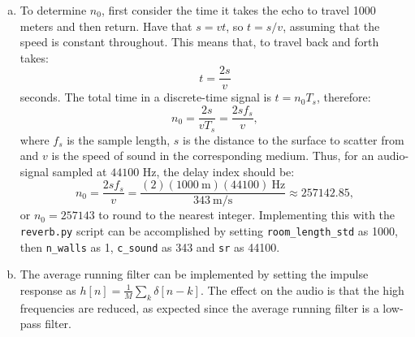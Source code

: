 \begin{enumerate}
\begin{enumerate}[a)]
    \item To determine $n_{0}$, first consider the time it takes the echo to travel 
    1000 meters and then return. Have that $s=vt$, so $t=s/v$, assuming that 
    the speed is constant throughout. This means that, to travel back and forth takes:
    $$t=\frac{2s}{v}$$
    seconds. The total time in a discrete-time signal is $t=n_{0}T_{s}$, therefore:
    $$n_{0}=\frac{2s}{vT_{s}}=\frac{2sf_{s}}{v},$$
    where $f_{s}$ is the sample length, $s$ is the distance to the surface to scatter 
    from and $v$ is the speed of sound in the corresponding medium. Thus, for an 
    audio-signal sampled at $44100$ Hz, the delay index should be:
    $$n_{0}=\frac{2sf_s}{v}=\frac{(2)(1000\ \text{m})(44100)\ \text{Hz}}{343\ \text{m/s}}\approx257142.85,$$
    or $n_{0}=257143$ to round to the nearest integer. Implementing this with the \verb|reverb.py| 
    script can be accomplished by setting \verb|room_length_std| as 1000, 
    then \verb|n_walls| as 1, \verb|c_sound| as 343 and \verb|sr| as 44100.
    
    \item The average running filter can be implemented by setting the impulse 
    response as $h[n]=\frac{1}{M}\sum_k \delta[n-k]$. The effect on the audio is 
    that the high frequencies are reduced, as expected since the average running filter is a low-pass filter. 

    

\end{enumerate}
\end{enumerate}